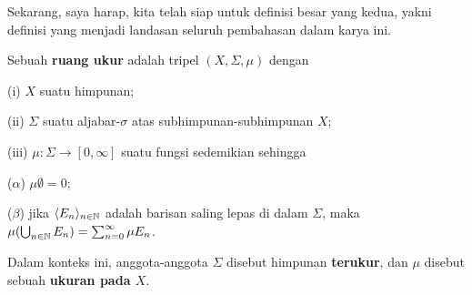 
\def\chaptername{Ruang ukur}
\def\sectionname{Ruang ukur}


Sekarang, saya harap, kita telah siap untuk definisi besar yang kedua,
yakni definisi yang menjadi landasan seluruh pembahasan dalam karya ini.

 Sebuah {\bf ruang ukur} adalah tripel
$(X,\Sigma,\mu)$ dengan

\quad(i) $X$ suatu himpunan;

\quad(ii) $\Sigma$ suatu aljabar-$\sigma$ atas subhimpunan-subhimpunan $X$;

\quad(iii) $\mu:\Sigma\to[0,\infty]$ suatu fungsi sedemikian sehingga

\qquad($\alpha$) $\mu\emptyset=0$;

\qquad($\beta$) jika $\langle E_n\rangle_{n\in\Bbb N}$ adalah barisan
saling lepas di dalam $\Sigma$, maka
$\mu(\bigcup_{n\in\Bbb N}E_n)=\sum_{n=0}^{\infty}\mu E_n$.

\noindent Dalam konteks ini, anggota-anggota $\Sigma$ disebut himpunan
{\bf terukur}, dan $\mu$ disebut sebuah {\bf ukuran pada $X$}.

